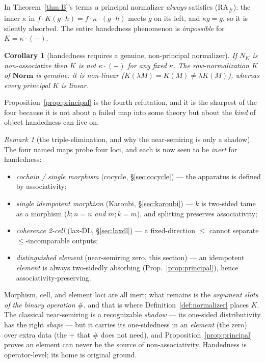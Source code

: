 \documentclass[11pt]{amsart}
\theoremstyle{plain}
\newtheorem{corollary}[theorem]{Corollary}
\theoremstyle{definition}
\theoremstyle{remark}
\newtheorem{remark}[theorem]{Remark}
\newcommand{\Norm}{\mathbf{Norm}}
\newcommand{\comp}{\mathbin{;}}
\newcommand{\sh}{\mathbin{\#}}
\newcommand{\RA}{\textsf{(RA}\textsubscript{\#}\textsf{)}}
\begin{document}
In Theorem~\ref{thm:B}'s terms a principal normalizer \emph{always} satisfies \RA{}: the inner
$\kappa$ in $f\cdot K(g\cdot h)=f\cdot\kappa\cdot(g\cdot h)$ meets $g$ on its left, and $\kappa g=g$,
so it is silently absorbed. The entire handedness phenomenon is \emph{impossible} for
$K=\kappa\cdot(-)$.

\begin{corollary}[handedness requires a genuine, non-principal normalizer]
\label{cor:nonprincipal}
If $N_{K}$ is non-associative then $K$ is \emph{not} $\kappa\cdot(-)$ for any fixed $\kappa$. The
row-normalization $K$ of $\Norm$ is genuine: it is \emph{non-linear} ($K(\lambda M)=K(M)\ne\lambda
K(M)$), whereas every principal $K$ is linear.
\end{corollary}

Proposition~\ref{prop:principal} is the fourth refutation, and it is the sharpest of the four because
it is not about a failed map into some theory but about the \emph{kind} of object handedness can
live on.

\begin{remark}[the triple-elimination, and why the near-semiring is only a shadow]
\label{rem:triple}
The four named maps probe four loci, and each is now seen to be \emph{inert} for handedness:
\begin{itemize}
  \item \emph{cochain / single morphism} (cocycle, \S\ref{sec:cocycle}) --- the apparatus is defined
        by associativity;
  \item \emph{single idempotent morphism} (Karoubi, \S\ref{sec:karoubi}) --- $k$ is two-sided tame as
        a morphism ($k\comp n=n$ \emph{and} $m\comp k=m$), and splitting preserves associativity;
  \item \emph{coherence 2-cell} (lax-DL, \S\ref{sec:laxdl}) --- a fixed-direction $\le$ cannot
        separate $\le$-incomparable outputs;
  \item \emph{distinguished element} (near-semiring zero, this section) --- an idempotent
        \emph{element} is always two-sidedly absorbing (Prop.~\ref{prop:principal}), hence
        associativity-preserving.
\end{itemize}
Morphism, cell, and element loci are all inert; what remains is the \emph{argument slots of the
binary operation} $\sh$, and that is where Definition~\ref{def:normalizer} places $K$. The classical
near-semiring is a recognizable \emph{shadow} --- its one-sided distributivity has the right
\emph{shape} --- but it carries its one-sidedness in an \emph{element} (the zero) over extra data
(the $+$ that $\sh$ does not need), and Proposition~\ref{prop:principal} proves an element can never
be the source of non-associativity. Handedness is operator-level; its home is original ground.
\end{remark}
\end{document}
